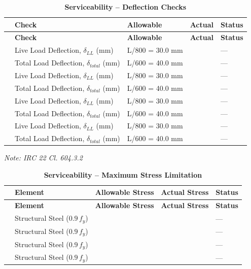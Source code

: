 \documentclass[12pt,a4paper]{report}
\numberwithin{table}{chapter}
\numberwithin{figure}{chapter}
\newcommand{\reportrowpad}{4pt}
\newcommand{\reportsectiongap}{0.75em}
\begin{document}
\vspace{\reportsectiongap}
\begin{longtable}{|C{2.5cm}|L{3.5cm}|C{3.5cm}|>{\centering\arraybackslash}p{3.5cm}|C{2.5cm}|}
\caption{\textbf{Serviceability -- Deflection Checks}}\\
\hline
\textbf{} & \textbf{Check} & \textbf{Allowable} & \textbf{Actual} & \textbf{Status} \\[\reportrowpad]
\hline
\endfirsthead
\hline
\textbf{} & \textbf{Check} & \textbf{Allowable} & \textbf{Actual} & \textbf{Status} \\[\reportrowpad]
\hline
\endhead
{} & Live Load Deflection, $\delta_{LL}$ (mm) & L/800 = 30.0 mm &  & --- \\[\reportrowpad]
 & Total Load Deflection, $\delta_{total}$ (mm) & L/600 = 40.0 mm &  & --- \\[\reportrowpad]
\hline
{} & Live Load Deflection, $\delta_{LL}$ (mm) & L/800 = 30.0 mm &  & --- \\[\reportrowpad]
 & Total Load Deflection, $\delta_{total}$ (mm) & L/600 = 40.0 mm &  & --- \\[\reportrowpad]
\hline
{} & Live Load Deflection, $\delta_{LL}$ (mm) & L/800 = 30.0 mm &  & --- \\[\reportrowpad]
 & Total Load Deflection, $\delta_{total}$ (mm) & L/600 = 40.0 mm &  & --- \\[\reportrowpad]
\hline
{} & Live Load Deflection, $\delta_{LL}$ (mm) & L/800 = 30.0 mm &  & --- \\[\reportrowpad]
 & Total Load Deflection, $\delta_{total}$ (mm) & L/600 = 40.0 mm &  & --- \\[\reportrowpad]
\hline
\end{longtable}
\noindent\textit{Note: IRC 22 Cl. 604.3.2}

\vspace{\reportsectiongap}
\begin{longtable}{|C{2.5cm}|L{3.5cm}|C{3.5cm}|>{\centering\arraybackslash}p{3.5cm}|C{2.5cm}|}
\caption{\textbf{Serviceability -- Maximum Stress Limitation}}\\
\hline
\textbf{} & \textbf{Element} & \textbf{Allowable Stress} & \textbf{Actual Stress} & \textbf{Status} \\[\reportrowpad]
\hline
\endfirsthead
\hline
\textbf{} & \textbf{Element} & \textbf{Allowable Stress} & \textbf{Actual Stress} & \textbf{Status} \\[\reportrowpad]
\hline
\endhead
{} & Structural Steel ($0.9\,f_y$) &  &  & --- \\[\reportrowpad]
\hline
{} & Structural Steel ($0.9\,f_y$) &  &  & --- \\[\reportrowpad]
\hline
{} & Structural Steel ($0.9\,f_y$) &  &  & --- \\[\reportrowpad]
\hline
{} & Structural Steel ($0.9\,f_y$) &  &  & --- \\[\reportrowpad]
\hline
\end{longtable}
\end{document}
